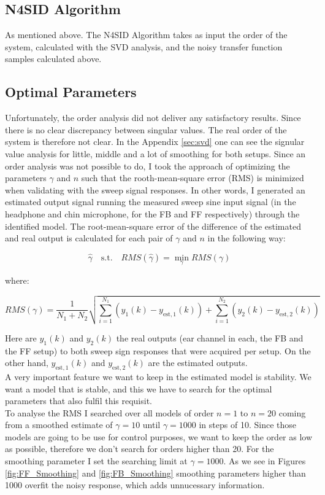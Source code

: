 \subsection{N4SID Algorithm}

As mentioned above. The N4SID Algorithm takes as input the order of the system, calculated with the SVD analysis, and the noisy transfer function samples calculated above. 

\subsection{Optimal Parameters}

Unfortunately, the order analysis did not deliver any satisfactory results. Since there is no clear discrepancy between singular values. The real order of the system is therefore not clear. In the Appendix \ref{sec:svd} one can see the signular value analysis for little, middle and a lot of smoothing for both setups. Since an order analysis was not possible to do, I took the approach of optimizing the parameters $\gamma$ and $n$ such that the rooth-mean-square error (RMS) is minimized when validating with the sweep signal responses. In other words, I generated an estimated output signal running the measured sweep sine input signal (in the headphone and chin microphone, for the FB and FF respectively) through the identified model. The root-mean-square error of the difference of the estimated and real output is calculated for each pair of $\gamma$ and $n$ in the following way:

\[\hat{\gamma} \quad\text{s.t.}\quad RMS(\hat{\gamma}) = \min\limits_\gamma RMS(\gamma)\]

where:

\[RMS(\gamma) = \frac{1}{N_1 + N_2} \sqrt{\sum\limits_{i=1}^{N_1}(y_1(k)-y_{\text{est},1}(k))+\sum\limits_{i=1}^{N_2}(y_2(k)-y_{\text{est},2}(k))}\]

Here are $y_1(k)$ and $y_2(k)$ the real outputs (ear channel in each, the FB and the FF setup) to both sweep sign responses that were acquired per setup. On the other hand, $y_{\text{est},1}(k)$ and $y_{\text{est},2}(k)$ are the estimated outputs.\\

A very important feature we want to keep in the estimated model is stability. We want a model that is stable, and this we have to search for the optimal parameters that also fulfil this requisit.\\

To analyse the RMS I searched over all models of order $n=1$ to $n = 20$ coming from a smoothed estimate of $\gamma = 10$ until $\gamma = 1000$ in steps of 10. Since those models are going to be use for control purposes, we want to keep the order as low as possible, therefore we don't search for orders higher than 20. For the smoothing parameter I set the searching limit at $\gamma = 1000$. As we see in Figures \ref{fig:FF_Smoothing} and \ref{fig:FB_Smoothing} smoothing parameters higher than 1000 overfit the noisy response, which adds unnucessary information. \\

